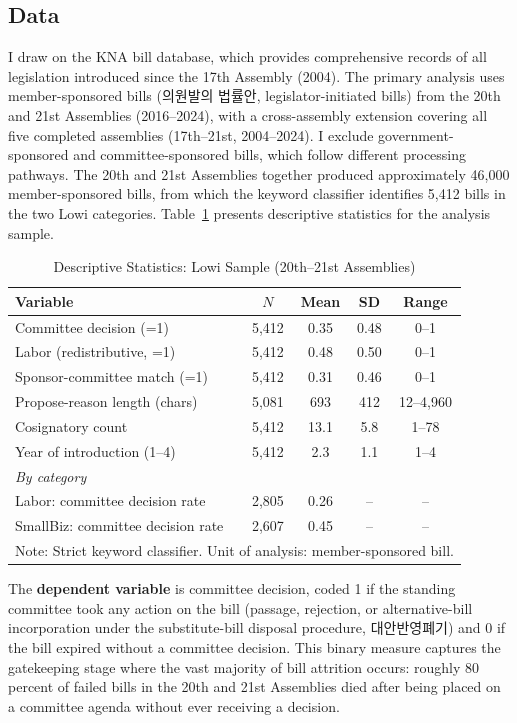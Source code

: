\documentclass[11pt]{article}
\begin{document}
\subsection{Data}
\label{sec:data}

I draw on the KNA bill database, which provides comprehensive records of all legislation introduced since the 17th Assembly (2004). The primary analysis uses member-sponsored bills (의원발의 법률안, legislator-initiated bills) from the 20th and 21st Assemblies (2016--2024), with a cross-assembly extension covering all five completed assemblies (17th--21st, 2004--2024). I exclude government-sponsored and committee-sponsored bills, which follow different processing pathways. The 20th and 21st Assemblies together produced approximately 46,000 member-sponsored bills, from which the keyword classifier identifies 5,412 bills in the two Lowi categories. Table~\ref{tab:desc} presents descriptive statistics for the analysis sample.

\begin{table}[H]
\centering
\caption{Descriptive Statistics: Lowi Sample (20th--21st Assemblies)}
\label{tab:desc}
\begin{tabular}{lcccc}
\toprule
Variable & $N$ & Mean & SD & Range \\
\midrule
Committee decision (=1) & 5,412 & 0.35 & 0.48 & 0--1 \\
Labor (redistributive, =1) & 5,412 & 0.48 & 0.50 & 0--1 \\
Sponsor-committee match (=1) & 5,412 & 0.31 & 0.46 & 0--1 \\
Propose-reason length (chars) & 5,081 & 693 & 412 & 12--4,960 \\
Cosignatory count & 5,412 & 13.1 & 5.8 & 1--78 \\
Year of introduction (1--4) & 5,412 & 2.3 & 1.1 & 1--4 \\
\midrule
\multicolumn{5}{l}{\textit{By category}} \\
\quad Labor: committee decision rate & 2,805 & 0.26 & -- & -- \\
\quad SmallBiz: committee decision rate & 2,607 & 0.45 & -- & -- \\
\bottomrule
\multicolumn{5}{l}{\footnotesize Note: Strict keyword classifier. Unit of analysis: member-sponsored bill.} \\
\end{tabular}
\end{table}

The \textbf{dependent variable} is committee decision, coded 1 if the standing committee took any action on the bill (passage, rejection, or alternative-bill incorporation under the substitute-bill disposal procedure, 대안반영폐기) and 0 if the bill expired without a committee decision. This binary measure captures the gatekeeping stage where the vast majority of bill attrition occurs: roughly 80 percent of failed bills in the 20th and 21st Assemblies died after being placed on a committee agenda without ever receiving a decision.
\end{document}
